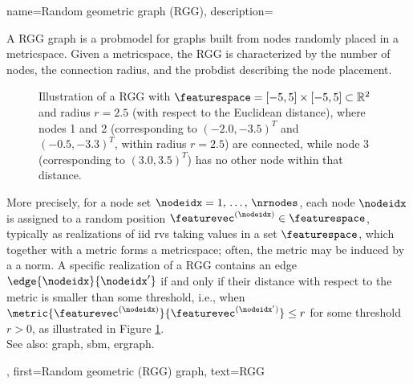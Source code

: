 {name={Random geometric graph (RGG)},
    description={A RGG \gls{graph} is a \gls{probmodel} for \glspl{graph} built from nodes randomly placed in a \gls{metricspace}. Given a \gls{metricspace}, the RGG is characterized by the number of nodes, the connection radius, and the \gls{probdist} describing the node placement. 
    \begin{figure}
    \centering
    \caption{Illustration of a RGG with $ \featurespace = [-5,5]\times[-5,5] \subset \mathbb{R}^2$ and radius $r=2.5$ (with respect to the Euclidean distance), where nodes 1 and 2 (corresponding to $(-2.0, -3.5)^T$ and $(-0.5, -3.3)^T$, within radius $r=2.5$) are connected, while node 3 (corresponding to $(3.0, 3.5)^T$) has no other node within that distance.}
    \label{fig:rgg}
    \end{figure}
    More precisely, for a node set $\nodeidx=1, \,\ldots, \,\nrnodes$, each node $\nodeidx$ is assigned to a random position $\featurevec^{(\nodeidx)} \in \featurespace$, typically as \glspl{realization} of \gls{iid} \glspl{rv} taking values in a set $\featurespace$, which together with a \gls{metric} forms a \gls{metricspace}; often, the \gls{metric} may be induced by a a \gls{norm}. A specific \gls{realization} of a RGG contains an edge $\edge{\nodeidx}{\nodeidx'}$ if and only if their distance with respect to the \gls{metric} is smaller than some threshold, i.e., when $\metric{\featurevec^{(\nodeidx)}}{\featurevec^{(\nodeidx')}}\leq r$ for some threshold $r>0$, as illustrated in Figure \ref{fig:rgg}.
         \\
        See also: \gls{graph}, \gls{sbm}, \gls{ergraph}.},
    first={Random geometric (RGG) graph},
    text={RGG}
}